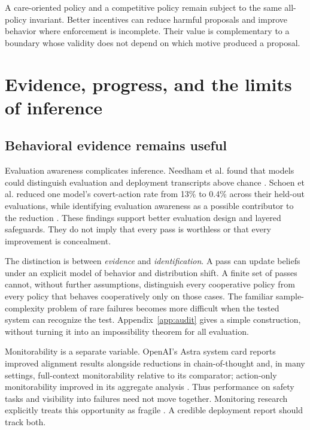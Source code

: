 \documentclass[10pt,twocolumn,letterpaper]{article}
\begin{document}
A care-oriented policy and a competitive policy remain subject to the same all-policy invariant. Better incentives can reduce harmful proposals and improve behavior where enforcement is incomplete. Their value is complementary to a boundary whose validity does not depend on which motive produced a proposal.

\section{Evidence, progress, and the limits of inference}
\label{sec:evidence}

\subsection{Behavioral evidence remains useful}
Evaluation awareness complicates inference. Needham et al. found that models could distinguish evaluation and deployment transcripts above chance \cite{needham}. Schoen et al. reduced one model's covert-action rate from 13\% to 0.4\% across their held-out evaluations, while identifying evaluation awareness as a possible contributor to the reduction \cite{schoen}. These findings support better evaluation design and layered safeguards. They do not imply that every pass is worthless or that every improvement is concealment.

The distinction is between \emph{evidence} and \emph{identification}. A pass can update beliefs under an explicit model of behavior and distribution shift. A finite set of passes cannot, without further assumptions, distinguish every cooperative policy from every policy that behaves cooperatively only on those cases. The familiar sample-complexity problem of rare failures becomes more difficult when the tested system can recognize the test. Appendix~\ref{app:audit} gives a simple construction, without turning it into an impossibility theorem for all evaluation.

Monitorability is a separate variable. OpenAI's Astra system card reports improved alignment results alongside reductions in chain-of-thought and, in many settings, full-context monitorability relative to its comparator; action-only monitorability improved in its aggregate analysis \cite{astra}. Thus performance on safety tasks and visibility into failures need not move together. Monitoring research explicitly treats this opportunity as fragile \cite{korbak}. A credible deployment report should track both.
\end{document}
